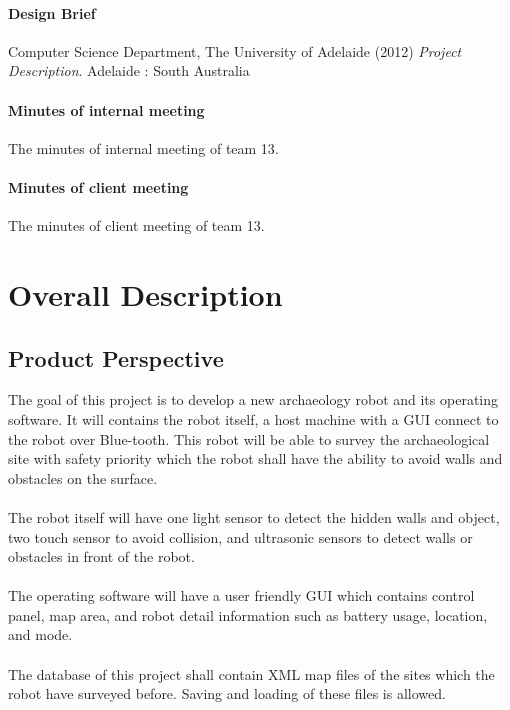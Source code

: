\documentclass[11pt, a4paper]{report}
\begin{document}
\subsubsection*{Design Brief}
Computer Science Department, The University of Adelaide (2012) \textit{Project Description}. Adelaide : South Australia

\subsubsection*{Minutes of internal meeting}
The minutes of internal meeting of team 13.

\subsubsection*{Minutes of client meeting}
The minutes of client meeting of team 13.

\pagebreak



\chapter{Overall Description}

\section{Product Perspective}
The goal of this project is to develop a new archaeology robot and its operating software. It will contains the robot itself, a host machine with a GUI connect to the robot over Blue-tooth. This robot will be able to survey the archaeological site with safety priority which the robot shall have the ability to avoid walls and obstacles on the surface. \\ \\
The robot itself will have one light sensor to detect the hidden walls and object, two touch sensor to avoid collision, and ultrasonic sensors to detect walls or obstacles in front of the robot. \\ \\
The operating software will have a user friendly GUI which contains control panel, map area, and robot detail information such as battery usage, location, and mode. \\ \\
The database of this project shall contain XML map files of the sites which the robot have surveyed before. Saving and loading of these files is allowed. 
\end{document}
